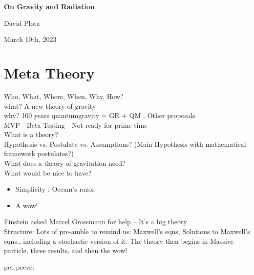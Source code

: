 \documentclass {article}
\begin{document}
\thispagestyle{empty}%

\begin{center}\strut
	\bfseries\Huge
	On Gravity and Radiation
\end{center}


\centerline{David Plotz}


\begin{center}\strut
March 10th, 2023
\end{center}
\vfill

	


\newpage

\section{Meta Theory}

Who, What, Where, When, Why, How?
\\[0.15in]
what?    A new theory of  gravity
\\
why?   100 years quantumgravity = GR + QM . Other proposals
\\[1in]


MVP - Beta Testing - Not ready for prime time
\\

What is a theory?
\\[1in]

Hypothesis vs. Postulate vs. Assumptions? (Main Hypothesis with mathematical framework postulates?)
\\[1in]



What does a theory of gravitation need?
\\[2in]

What would be nice to have? 
\begin{itemize}
	\item Simplicity : Occam's razor
	\item A wow!
\end{itemize}

\vspace{10pt}

Einstein asked Marcel Grossmann for help -- It's a big theory
\\[2in]

Structure: Lots of pre-amble to remind us: Maxwell's eqns, Solutions to Maxwell's eqns., including a stochastic version of it. The theory then begins in Massive particle, three results, and then the wow!

pet peeve:
\end{document}
